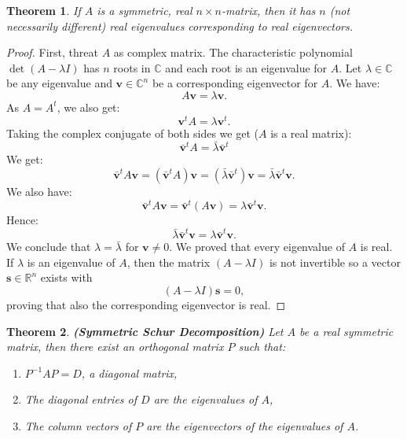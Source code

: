 \documentclass[a4paper,11pt]{report}
\newtheorem{theorem}{Theorem}[section]
\newcommand{\R}{{\mathbb R}}
\newcommand{\C}{{\mathbb C}}
\begin{document}
\begin{theorem}
  If $A$ is a symmetric, real $n\times n$-matrix, then it has $n$ (not necessarily different) real eigenvalues corresponding
  to real eigenvectors.
  \end{theorem}
  \begin{proof}
    First, threat $A$ as complex matrix.
    The characteristic polynomial $\det(A-\lambda I)$ has $n$ roots in $\C$ and 
    each root is an eigenvalue for $A$. Let $\lambda \in \C$ be any eigenvalue 
    and $\mathbf{v} \in \C^n$ be a corresponding eigenvector for $A$. We have:
    $$A\mathbf{v} = \lambda\mathbf{v}.$$ As $A = A^t$, we also get:
    $$\mathbf{v}^tA = \lambda \mathbf{v}^t.$$
    Taking the complex conjugate of both sides we get ($A$ is a real matrix):
    $$\bar{\mathbf{v}}^tA = \bar{\lambda}\bar{\mathbf{v}}^t$$
    We get:
    $$\bar{\mathbf{v}}^tA\mathbf{v} = (\bar{\mathbf{v}}^tA)\mathbf{v} = (\bar{\lambda}\bar{\mathbf{v}}^t)\mathbf{v} 
    = \bar{\lambda}\bar{\mathbf{v}}^t\mathbf{v}.$$
    We also have:
    $$\bar{\mathbf{v}}^tA\mathbf{v} = \bar{\mathbf{v}}^t(A\mathbf{v}) = 
    \lambda\bar{\mathbf{v}}^t\mathbf{v}.$$
    Hence:
    $$\bar{\lambda}\bar{\mathbf{v}}^t\mathbf{v} = \lambda\bar{\mathbf{v}}^t\mathbf{v}.$$
    We conclude that $\lambda = \bar{\lambda}$ for $\mathbf{v} \not = 0$. 
    We proved that every eigenvalue of $A$ is real. If $\lambda$ is an 
    eigenvalue of $A$, then the matrix $(A - \lambda I)$ is not invertible so a 
    vector $\mathbf{s} \in \R^n$ exists with $$(A - \lambda I)\mathbf{s} = 0,$$ 
    proving that also the corresponding eigenvector is real.
    
  \end{proof}
\begin{theorem}\label{diagonaal}\textbf{(Symmetric Schur Decomposition)}
  Let $A$ be a real symmetric matrix, then there exist an orthogonal 
  matrix $P$ such that:
  \begin{enumerate}
    \item[(i)] $P^{-1}AP = D$, a diagonal matrix,
    \item[(ii)] The diagonal entries of $D$ are the eigenvalues of $A$,
    \item[(iii)] The column vectors of $P$ are the eigenvectors of the 
    eigenvalues of $A$.
  \end{enumerate}
\end{theorem}
\end{document}
